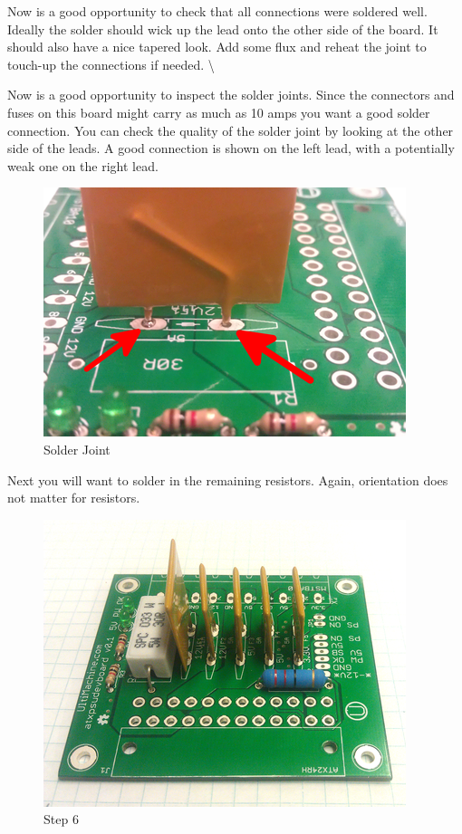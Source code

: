Now is a good opportunity to check that all connections were soldered
well. Ideally the solder should wick up the lead onto the other side of
the board. It should also have a nice tapered look. Add some flux and
reheat the joint to touch-up the connections if needed. \textbackslash{}

Now is a good opportunity to inspect the solder joints. Since the
connectors and fuses on this board might carry as much as 10 amps you
want a good solder connection. You can check the quality of the solder
joint by looking at the other side of the leads. A good connection is
shown on the left lead, with a potentially weak one on the right lead.

\begin{figure}[H]
\centering
\includegraphics{./png/solder-joint.png}
\caption{Solder Joint}
\end{figure}

Next you will want to solder in the remaining resistors. Again,
orientation does not matter for resistors.

\begin{figure}[H]
\centering
\includegraphics{./png/step-06.png}
\caption{Step 6}
\end{figure}

